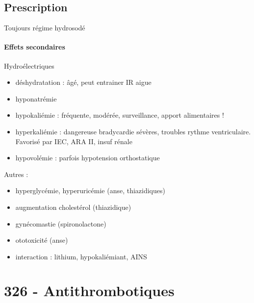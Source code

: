 \subsection{Prescription}
Toujours régime hydrosodé

\paragraph{Effets secondaires}
Hydroélectriques 
\begin{itemize}
  \item déshydratation : âgé, peut entrainer IR aigue
  \item hyponatrémie 
  \item hypokaliémie : fréquente, modérée, surveillance, apport alimentaires
    !
  \item hyperkaliémie : dangereuse \danger{} bradycardie sévères, troubles
    rythme ventriculaire. Favorisé par IEC, ARA II, insuf rénale
  \item hypovolémie : parfois hypotension orthostatique
\end{itemize}
Autres : 
\begin{itemize}
  \item hyperglycémie, hyperuricémie (anse, thiazidiques)
  \item augmentation cholestérol (thiazidique)
  \item gynécomastie (spironolactone)
  \item ototoxicité (anse)
  \item interaction : lithium, hypokaliémiant, AINS
\end{itemize}

\section{326 - Antithrombotiques}%
\label{sec:326_antithrombotiques}
